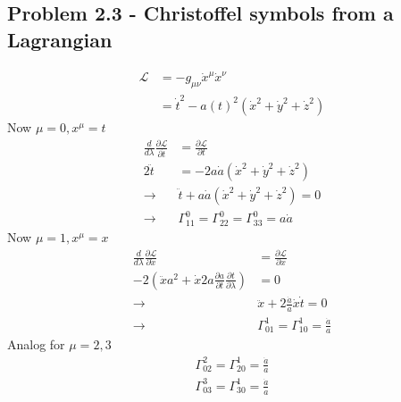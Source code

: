 \documentclass[10pt,a4paper]{book}
\theoremstyle{definition}
\begin{document}
\subsection{Problem 2.3 - Christoffel symbols from a Lagrangian}
\begin{align}
\mathcal{L}&=-g_{\mu\nu}\dot{x}^\mu\dot{x}^\nu\\
&=\dot{t}^2-a(t)^2(\dot{x}^2+\dot{y}^2+\dot{z}^2)
\end{align}
Now $\mu=0, x^\mu=t$
\begin{align}
\frac{d}{d\lambda}\frac{\partial\mathcal{L}}{\partial \dot{t}}&=\frac{\partial\mathcal{L}}{\partial t}\\
2\ddot{t}&=-2a\dot{a}(\dot{x}^2+\dot{y}^2+\dot{z}^2)\\
\rightarrow&\ddot{t}+a\dot{a}(\dot{x}^2+\dot{y}^2+\dot{z}^2)=0\\
\rightarrow&\Gamma^0_{11}=\Gamma^0_{22}=\Gamma^0_{33}=a\dot{a}
\end{align}
Now $\mu=1, x^\mu=x$
\begin{align}
\frac{d}{d\lambda}\frac{\partial\mathcal{L}}{\partial \dot{x}}&=\frac{\partial\mathcal{L}}{\partial x}\\
-2\left(\ddot{x}a^2+\dot{x}2a\frac{\partial a}{\partial t}\frac{\partial t}{\partial\lambda}\right)&=0\\
\rightarrow&\ddot{x}+2\frac{\dot{a}}{a}\dot{x}\dot{t}=0\\
\rightarrow&\Gamma^1_{01}=\Gamma^1_{10}=\frac{\dot{a}}{a}
\end{align}
Analog for $\mu=2,3$
\begin{align}
\Gamma^2_{02}=\Gamma^1_{20}=\frac{\dot{a}}{a}\\
\Gamma^3_{03}=\Gamma^1_{30}=\frac{\dot{a}}{a}
\end{align}
\end{document}
